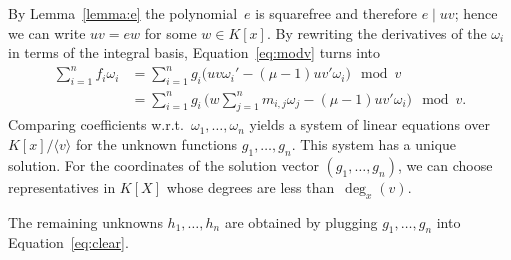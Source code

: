 \documentclass[final,1p,times,authoryear]{elsarticle}
\def\<#1>{\langle#1\rangle}
\begin{document}
By Lemma~\ref{lemma:e} the polynomial~$e$ is squarefree and therefore $e\mid uv$;
hence we can write $uv=ew$ for some $w\in K[x]$. By rewriting the
derivatives of the $\omega_i$ in terms of the integral basis,
Equation~\eqref{eq:modv} turns into
\begin{align*}
  \sum_{i=1}^n f_i\omega_i
  &= \sum_{i=1}^n g_i \bigl( uv\omega_i' - (\mu-1)uv'\omega_i \bigr) \mod v\\
  &= \sum_{i=1}^n g_i\, \biggl( w\sum_{j=1}^n m_{i,j}\omega_j - (\mu-1)uv'\omega_i \biggr) \mod v.
\end{align*}
Comparing coefficients w.r.t.\ $\omega_1,\ldots,\omega_n$ yields a
system of linear equations over $K[x]/\<v>$ for the unknown
functions $g_1,\ldots,g_n$. This system has
a unique solution. For the coordinates of the solution vector $(g_1,\dots,g_n)$,
we can choose representatives in $K[X]$ whose degrees are less than~$\deg_x(v)$.

The remaining unknowns $h_1,\ldots,h_n$ are obtained by plugging
$g_1,\ldots,g_n$ into Equation~\eqref{eq:clear}.
\end{document}
